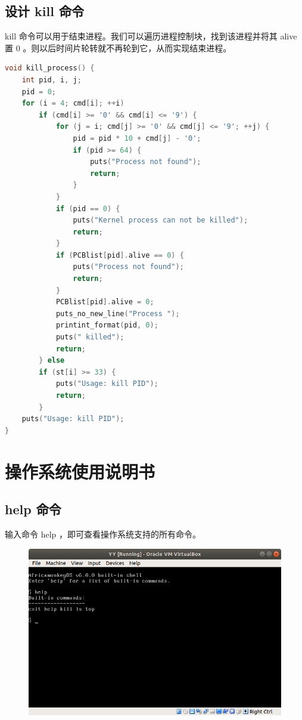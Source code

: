 \documentclass{article}
\begin{document}
\subsection{设计 kill 命令}

kill 命令可以用于结束进程。我们可以遍历进程控制块，找到该进程并将其 alive 置 0 。则以后时间片轮转就不再轮到它，从而实现结束进程。

\begin{lstlisting}[language=C]
void kill_process() {
	int pid, i, j;
	pid = 0;
	for (i = 4; cmd[i]; ++i)
		if (cmd[i] >= '0' && cmd[i] <= '9') {
			for (j = i; cmd[j] >= '0' && cmd[j] <= '9'; ++j) {
				pid = pid * 10 + cmd[j] - '0';
				if (pid >= 64) {
					puts("Process not found");
					return;
				}
			}
			if (pid == 0) {
				puts("Kernel process can not be killed");
				return;
			}
			if (PCBlist[pid].alive == 0) {
				puts("Process not found");
				return;
			}
			PCBlist[pid].alive = 0;
			puts_no_new_line("Process ");
			printint_format(pid, 0);
			puts(" killed");
			return;
		} else
		if (st[i] >= 33) {
			puts("Usage: kill PID");
			return;
		}
	puts("Usage: kill PID");
}
\end{lstlisting}

\section{操作系统使用说明书}

\subsection{help 命令}

输入命令 help ，即可查看操作系统支持的所有命令。

\begin{figure}[!hbp]
	\centering
	\includegraphics[scale=0.5]{pics/3.png}
\end{figure}
\end{document}

